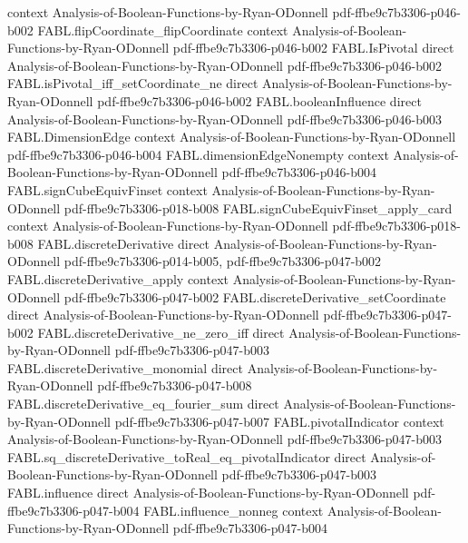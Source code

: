 \begin{theorem}
  {context}
  {Analysis-of-Boolean-Functions-by-Ryan-ODonnell}
  {pdf-ffbe9c7b3306-p046-b002}
\proofstep
  {FABL.flipCoordinate_flipCoordinate}
  {context}
  {Analysis-of-Boolean-Functions-by-Ryan-ODonnell}
  {pdf-ffbe9c7b3306-p046-b002}
\proofstep
  {FABL.IsPivotal}
  {direct}
  {Analysis-of-Boolean-Functions-by-Ryan-ODonnell}
  {pdf-ffbe9c7b3306-p046-b002}
\proofstep
  {FABL.isPivotal_iff_setCoordinate_ne}
  {direct}
  {Analysis-of-Boolean-Functions-by-Ryan-ODonnell}
  {pdf-ffbe9c7b3306-p046-b002}
\proofstep
  {FABL.booleanInfluence}
  {direct}
  {Analysis-of-Boolean-Functions-by-Ryan-ODonnell}
  {pdf-ffbe9c7b3306-p046-b003}
\proofstep
  {FABL.DimensionEdge}
  {context}
  {Analysis-of-Boolean-Functions-by-Ryan-ODonnell}
  {pdf-ffbe9c7b3306-p046-b004}
\proofstep
  {FABL.dimensionEdgeNonempty}
  {context}
  {Analysis-of-Boolean-Functions-by-Ryan-ODonnell}
  {pdf-ffbe9c7b3306-p046-b004}
\proofstep
  {FABL.signCubeEquivFinset}
  {context}
  {Analysis-of-Boolean-Functions-by-Ryan-ODonnell}
  {pdf-ffbe9c7b3306-p018-b008}
\proofstep
  {FABL.signCubeEquivFinset_apply_card}
  {context}
  {Analysis-of-Boolean-Functions-by-Ryan-ODonnell}
  {pdf-ffbe9c7b3306-p018-b008}
\proofstep
  {FABL.discreteDerivative}
  {direct}
  {Analysis-of-Boolean-Functions-by-Ryan-ODonnell}
  {pdf-ffbe9c7b3306-p014-b005,
    pdf-ffbe9c7b3306-p047-b002}
\proofstep
  {FABL.discreteDerivative_apply}
  {context}
  {Analysis-of-Boolean-Functions-by-Ryan-ODonnell}
  {pdf-ffbe9c7b3306-p047-b002}
\proofstep
  {FABL.discreteDerivative_setCoordinate}
  {direct}
  {Analysis-of-Boolean-Functions-by-Ryan-ODonnell}
  {pdf-ffbe9c7b3306-p047-b002}
\proofstep
  {FABL.discreteDerivative_ne_zero_iff}
  {direct}
  {Analysis-of-Boolean-Functions-by-Ryan-ODonnell}
  {pdf-ffbe9c7b3306-p047-b003}
\proofstep
  {FABL.discreteDerivative_monomial}
  {direct}
  {Analysis-of-Boolean-Functions-by-Ryan-ODonnell}
  {pdf-ffbe9c7b3306-p047-b008}
\proofstep
  {FABL.discreteDerivative_eq_fourier_sum}
  {direct}
  {Analysis-of-Boolean-Functions-by-Ryan-ODonnell}
  {pdf-ffbe9c7b3306-p047-b007}
\proofstep
  {FABL.pivotalIndicator}
  {context}
  {Analysis-of-Boolean-Functions-by-Ryan-ODonnell}
  {pdf-ffbe9c7b3306-p047-b003}
\proofstep
  {FABL.sq_discreteDerivative_toReal_eq_pivotalIndicator}
  {direct}
  {Analysis-of-Boolean-Functions-by-Ryan-ODonnell}
  {pdf-ffbe9c7b3306-p047-b003}
\proofstep
  {FABL.influence}
  {direct}
  {Analysis-of-Boolean-Functions-by-Ryan-ODonnell}
  {pdf-ffbe9c7b3306-p047-b004}
\proofstep
  {FABL.influence_nonneg}
  {context}
  {Analysis-of-Boolean-Functions-by-Ryan-ODonnell}
  {pdf-ffbe9c7b3306-p047-b004}

\end{theorem}
